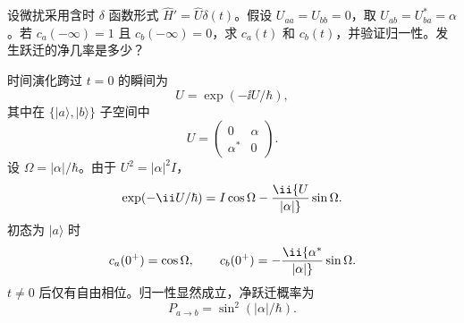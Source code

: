 \begin{question}
设微扰采用含时 $\delta$ 函数形式 $\hat H'=\hat U\delta(t)$。假设 $U_{aa}=U_{bb}=0$，取 $U_{ab}=U_{ba}^*=\alpha$。若 $c_a(-\infty)=1$ 且 $c_b(-\infty)=0$，求 $c_a(t)$ 和 $c_b(t)$，并验证归一性。发生跃迁的净几率是多少？
\end{question}
\begin{solution}
时间演化跨过 $t=0$ 的瞬间为
\[
U=\exp(-\ii U/\hbar),
\]
其中在 $\{|a\rangle,|b\rangle\}$ 子空间中
\[
U=\begin{pmatrix}0&\alpha\\ \alpha^*&0\end{pmatrix}.
\]
设 $\Omega=|\alpha|/\hbar$。由于 $U^2=|\alpha|^2 I$，
\[
\exp(-\ii U/\hbar)=I\cos\Omega-\ii {U\over|\alpha|}\sin\Omega.
\]
初态为 $|a\rangle$ 时
\[
c_a(0^+)=\cos\Omega,
\qquad
c_b(0^+)=-\ii {\alpha^*\over|\alpha|}\sin\Omega.
\]
$t\ne0$ 后仅有自由相位。归一性显然成立，净跃迁概率为
\[
\boxed{P_{a\to b}=\sin^2(|\alpha|/\hbar).}
\]
\end{solution}

